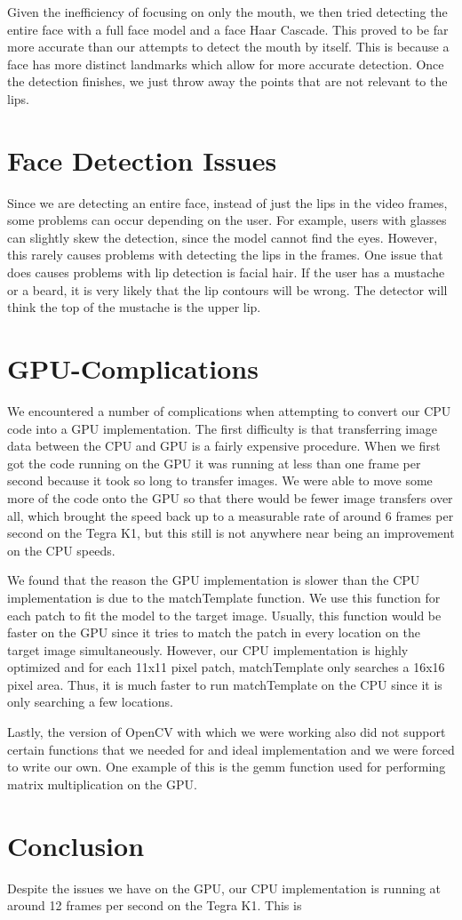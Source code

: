 Given the inefficiency of focusing on only the mouth, we then tried detecting the entire face with a full face model and a face Haar Cascade. This proved to be far more accurate than our attempts to detect the mouth by itself. This is because a face has more distinct landmarks which allow for more accurate detection. Once the detection finishes, we just throw away the points that are not relevant to the lips.

\section{Face Detection Issues}
Since we are detecting an entire face, instead of just the lips in the video frames, some problems can occur depending on the user. For example, users with glasses can slightly skew the detection, since the model cannot find the eyes. However, this rarely causes problems with detecting the lips in the frames. One issue that does causes problems with lip detection is facial hair. If the user has a mustache or a beard, it is very likely that the lip contours will be wrong. The detector will think the top of the mustache is the upper lip.

\section{GPU-Complications}
We encountered a number of complications when attempting to convert our CPU code into a GPU implementation. The first difficulty is that transferring image data between the CPU and GPU is a fairly expensive procedure. When we first got the code running on the GPU it was running at less than one frame per second because it took so long to transfer images. We were able to move some more of the code onto the GPU so that there would be fewer image transfers over all, which brought the speed back up to a measurable rate of around 6 frames per second on the Tegra K1, but this still is not anywhere near being an improvement on the CPU speeds.

We found that the reason the GPU implementation is slower than the CPU implementation is due to the matchTemplate function. We use this function for each patch to fit the model to the target image. Usually, this function would be faster on the GPU since it tries to match the patch in every location on the target image simultaneously. However, our CPU implementation is highly optimized and for each 11x11 pixel patch, matchTemplate only searches a 16x16 pixel area. Thus, it is much faster to run matchTemplate on the CPU since it is only searching a few locations.

Lastly, the version of OpenCV with which we were working also did not support certain functions that we needed for and ideal implementation and we were forced to write our own. One example of this is the gemm function used for performing matrix multiplication on the GPU.

\section{Conclusion}
Despite the issues we have on the GPU, our CPU implementation is running at around 12 frames per second on the Tegra K1. This is 